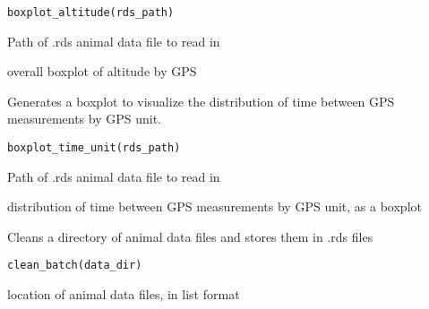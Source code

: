 \documentclass[a4paper]{book}
\begin{document}
%
\begin{Usage}
\begin{verbatim}
boxplot_altitude(rds_path)
\end{verbatim}
\end{Usage}
%
\begin{Arguments}
\begin{ldescription}
\item[\code{rds\_path}] Path of .rds animal data file to read in
\end{ldescription}
\end{Arguments}
%
\begin{Value}
overall boxplot of altitude by GPS
\end{Value}
%
\begin{Description}\relax
Generates a boxplot to visualize the distribution of time between
GPS measurements by GPS unit.
\end{Description}
%
\begin{Usage}
\begin{verbatim}
boxplot_time_unit(rds_path)
\end{verbatim}
\end{Usage}
%
\begin{Arguments}
\begin{ldescription}
\item[\code{rds\_path}] Path of .rds animal data file to read in
\end{ldescription}
\end{Arguments}
%
\begin{Value}
distribution of time between GPS measurements by GPS unit, as a boxplot
\end{Value}
%
\begin{Description}\relax
Cleans a directory of animal data files and stores them in .rds files
\end{Description}
%
\begin{Usage}
\begin{verbatim}
clean_batch(data_dir)
\end{verbatim}
\end{Usage}
%
\begin{Arguments}
\begin{ldescription}
\item[\code{data\_dir}] location of animal data files, in list format
\end{ldescription}
\end{Arguments}
\end{document}

